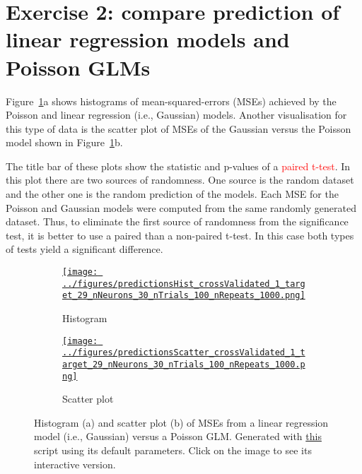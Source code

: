\documentclass[12pt]{article}
\def\figWidth{4.5in}
\begin{document}
\section*{Exercise 2: compare prediction of linear regression models and Poisson
GLMs}
\label{sec:comparePredictions}

Figure~\ref{fig:mses_PoissonVsGaussian}a shows histograms of
mean-squared-errors (MSEs) achieved by the Poisson and linear regression (i.e.,
Gaussian) models. Another  visualisation for this type of data is the scatter
plot of MSEs of the Gaussian versus the Poisson model shown in
Figure~\ref{fig:mses_PoissonVsGaussian}b.

The title bar of these plots show the statistic and p-values of a
\textcolor{red}{paired t-test}. In this plot there are two sources of randomness.
One source is the random dataset and the other one is the random prediction of
the models. Each MSE for the Poisson and Gaussian models were computed from the
same randomly generated dataset.  Thus, to eliminate the first source of
randomness from the significance test, it is better to use a paired  than a
non-paired t-test. In this case both types of tests yield a significant
difference.

\begin{figure}[H]
    \centering
    \begin{subfigure}{\textwidth}
        \centering
        \href{https://www.gatsby.ucl.ac.uk/~rapela/neuroinformatics/2023/ws7/figures/predictionsHist_crossValidated_1_target_29_nNeurons_30_nTrials_100_nRepeats_1000.html}{\texttt{[image: ../figures/predictionsHist\_crossValidated\_1\_target\_29\_nNeurons\_30\_nTrials\_100\_nRepeats\_1000.png]}}
        \caption{Histogram}
    \end{subfigure}
    \begin{subfigure}{\textwidth}
        \centering
        \href{https://www.gatsby.ucl.ac.uk/~rapela/neuroinformatics/2023/ws7/figures/predictionsScatter_crossValidated_1_target_29_nNeurons_30_nTrials_100_nRepeats_1000.html}{\texttt{[image: ../figures/predictionsScatter\_crossValidated\_1\_target\_29\_nNeurons\_30\_nTrials\_100\_nRepeats\_1000.png]}}
        \caption{Scatter plot}
    \end{subfigure}
    \caption{Histogram (a) and scatter plot (b) of MSEs from a linear
    regression model (i.e., Gaussian) versus a Poisson GLM.
    Generated with
    \href{https://github.com/joacorapela/neuroinformatics23/blob/master/worksheets/ws7/mySolution/code/scripts/doComputePredictions.py}{this}
    script using its default parameters. Click on the image to see its
    interactive version.}

    \label{fig:mses_PoissonVsGaussian}
\end{figure}
\end{document}
